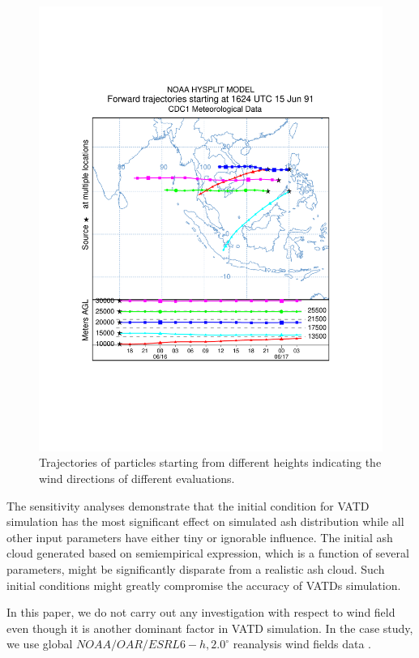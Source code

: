 \documentclass[draft,linenumbers]{agujournal2019}
\begin{document}
\begin{figure}[!htb]
\centering
\begin{minipage}{.75 \textwidth}
\centering
\includegraphics[width=0.99 \textwidth]{Figures/trajplot_test3_10_30K_ok}
\end{minipage}%
\caption{Trajectories of particles starting from different heights indicating the wind directions of different evaluations.}
\label{fig:hysplit-1624-utc}
\end{figure}

The sensitivity analyses demonstrate that the initial condition for VATD simulation has the most significant effect on simulated ash distribution while all other input parameters have either tiny or ignorable influence. The initial ash cloud generated based on semiempirical expression, which is a function of several parameters, might be significantly disparate from a realistic ash cloud. Such initial conditions might greatly compromise the accuracy of VATDs simulation.


In this paper, we do not carry out any investigation with respect to wind field even though it is another dominant factor in VATD simulation. In the case study, we use global $NOAA/OAR/ESRL 6-h, 2.0^{\circ}$ reanalysis wind fields data \citep{whitaker2004reanalysis, compo2006feasibility, compo2011twentieth}.
\end{document}
